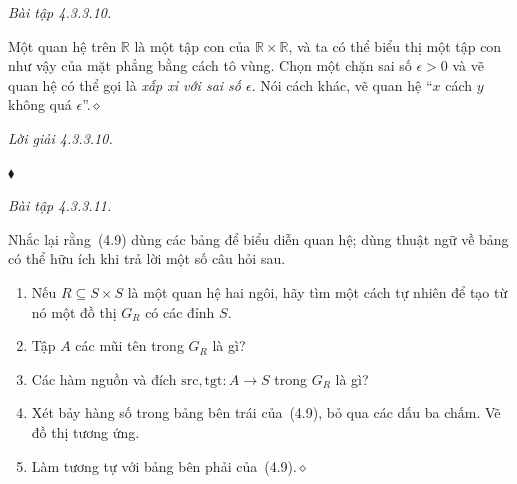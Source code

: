 \noindent\textit{Bài tập 4.3.3.10.}\keepwithnext

Một quan hệ trên $\mathbb{R}$ là một tập con của $\mathbb{R}\times\mathbb{R}$, và ta có thể biểu thị một tập con như vậy của mặt phẳng bằng cách tô vùng. Chọn một chặn sai số $\epsilon>0$ và vẽ quan hệ có thể gọi là \emph{xấp xỉ với sai số $\epsilon$}. Nói cách khác, vẽ quan hệ ``$x$ cách $y$ không quá $\epsilon$''.\hfill$\diamond$

\noindent\textit{Lời giải 4.3.3.10.}\keepwithnext
\begin{center}
\quad$\blacklozenge$
\end{center}

\noindent\textit{Bài tập 4.3.3.11.}\keepwithnext

Nhắc lại rằng~(4.9) dùng các bảng để biểu diễn quan hệ; dùng thuật ngữ về bảng có thể hữu ích khi trả lời một số câu hỏi sau.
\begin{enumerate}[label=\alph*.]
\item Nếu $R\subseteq S\times S$ là một quan hệ hai ngôi, hãy tìm một cách tự nhiên để tạo từ nó một đồ thị $G_R$ có các đỉnh $S$.
\item Tập $A$ các mũi tên trong $G_R$ là gì?
\item Các hàm nguồn và đích $\mathrm{src},\mathrm{tgt}:A\to S$ trong $G_R$ là gì?
\item Xét bảy hàng số trong bảng bên trái của~(4.9), bỏ qua các dấu ba chấm. Vẽ đồ thị tương ứng.
\item Làm tương tự với bảng bên phải của~(4.9).\nobreak\hfill$\diamond$
\end{enumerate}


